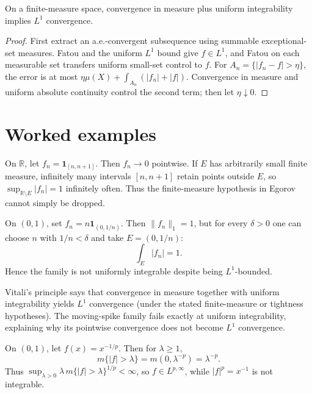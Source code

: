 \begin{theorem}\label{thm:iii08-03}
On a finite-measure space, convergence in measure plus uniform integrability implies $L^1$ convergence.
\begin{proof}
First extract an a.e.-convergent subsequence using summable exceptional-set measures. Fatou and the uniform $L^1$ bound give $f\in L^1$, and Fatou on each measurable set transfers uniform small-set control to $f$. For $A_n=\{|f_n-f|>\eta\}$, the error is at most $\eta\mu(X)+\int_{A_n}(|f_n|+|f|)$. Convergence in measure and uniform absolute continuity control the second term; then let $\eta\downarrow0$.
\end{proof}
\end{theorem}

\section{Worked examples}

\begin{example}\label{ex:iii08-worked-01}
On \(\mathbb R\), let \(f_n=\mathbf1_{[n,n+1]}\). Then \(f_n\to0\)
pointwise. If \(E\) has arbitrarily small finite measure, infinitely many
intervals \([n,n+1]\) retain points outside \(E\), so
\(\sup_{\mathbb R\setminus E}|f_n|=1\) infinitely often. Thus the finite-measure
hypothesis in Egorov cannot simply be dropped.
\end{example}

\begin{example}\label{ex:iii08-worked-02}
On \((0,1)\), set \(f_n=n\mathbf1_{(0,1/n)}\). Then
\(\|f_n\|_1=1\), but for every \(\delta>0\) one can choose \(n\) with
\(1/n<\delta\) and take \(E=(0,1/n)\):
\[
\int_E|f_n|=1.
\]
Hence the family is not uniformly integrable despite being \(L^1\)-bounded.
\end{example}

\begin{example}\label{ex:iii08-worked-03}
Vitali's principle says that convergence in measure together with uniform
integrability yields \(L^1\) convergence (under the stated finite-measure or
tightness hypotheses). The moving-spike family fails exactly at uniform
integrability, explaining why its pointwise convergence does not become
\(L^1\) convergence.
\end{example}

\begin{example}\label{ex:iii08-worked-04}
On \((0,1)\), let \(f(x)=x^{-1/p}\). Then for \(\lambda\ge1\),
\[
m\{|f|>\lambda\}=m(0,\lambda^{-p})=\lambda^{-p}.
\]
Thus \(\sup_{\lambda>0}\lambda\,m\{|f|>\lambda\}^{1/p}<\infty\), so
\(f\in L^{p,\infty}\), while \(|f|^p=x^{-1}\) is not integrable.
\end{example}

